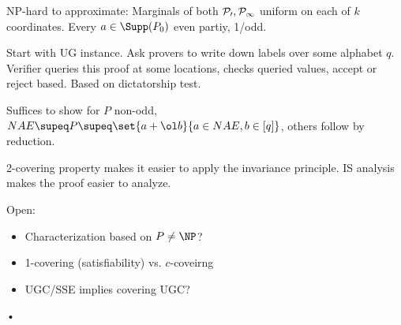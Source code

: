 NP-hard to approximate: 
Marginals of both $\cal P_0,\cal P_1$ uniform on each of $k$ coordinates. Every $a\in \Supp(P_0)$ even partiy, 1/odd.

Start with UG instance. Ask provers to write down labels over some alphabet $q$. Verifier queries this proof at some locations, checks queried values, accept or reject based. Based on dictatorship test.

Suffices to show for $P$ non-odd, $NAE\supeq P\supeq \set{a+\ol b}{a\in NAE, b\in [q]}$, others follow by reduction.

2-covering property makes it easier to apply the invariance principle. IS analysis makes the proof easier to analyze.

Open:
\begin{itemize}
\item
Characterization based on $P\ne \NP$?
\item
1-covering (satisfiability) vs. $c$-coveirng
\item
UGC/SSE implies covering UGC?
\end{itemize}•